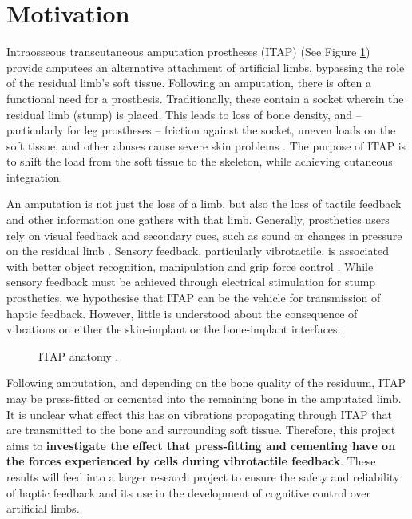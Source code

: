 \section{Motivation}
Intraosseous transcutaneous amputation prostheses (ITAP) \cite{kang_osseocutaneous_2010} (See Figure \ref{fig:ITAP-nosensors}) provide amputees an alternative attachment of artificial limbs, bypassing the role of the residual limb's soft tissue.
Following an amputation, there is often a functional need for a prosthesis. Traditionally, these contain a socket wherein the residual limb (stump) is placed.
This leads to loss of bone density, and -- particularly for leg prostheses -- friction against the socket, uneven loads on the soft tissue, and other abuses cause severe skin problems \citep{levy_skin_1980}.
The purpose of ITAP is to shift the load from the soft tissue to the skeleton, while achieving cutaneous integration.

An amputation is not just the loss of a limb, but also the loss of tactile feedback and other information one gathers with that limb.
Generally, prosthetics users rely on visual feedback and secondary cues, such as sound or changes in pressure on the residual limb \cite{schofield_applications_2014}.
Sensory feedback, particularly vibrotactile, is associated with better object recognition, manipulation and grip force control \cite{schiefer_artificial_2018}\cite{rosenbaum-chou_development_2016}.
While sensory feedback must be achieved through electrical stimulation for stump prosthetics, we hypothesise that ITAP can be the vehicle for transmission of haptic feedback.
However, little is understood about the consequence of vibrations on either the skin-implant or the bone-implant interfaces.

\begin{figure}[h]\centering
    \caption{ITAP anatomy \cite{kang_osseocutaneous_2010}.}
    \label{fig:ITAP-nosensors}
\end{figure}

Following amputation, and depending on the bone quality of the residuum, ITAP may be press-fitted or cemented into the remaining bone in the amputated limb.
It is unclear what effect this has on vibrations propagating through ITAP that are transmitted to the bone and surrounding soft tissue.
Therefore, this project aims to \textbf{investigate the effect that press-fitting and cementing have on the forces experienced by cells during vibrotactile feedback}.
These results will feed into a larger research project to ensure the safety and reliability of haptic feedback and its use in the development of cognitive control over artificial limbs.



